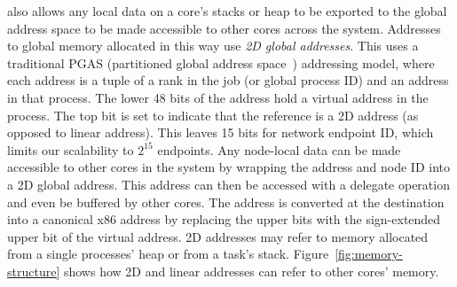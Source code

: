 \Grappa also allows any local data on a core's stacks or heap to be exported
to the global address space to be made accessible to other cores across the
system. Addresses to global memory allocated in this way use \emph{2D global
addresses}. This uses a traditional PGAS (partitioned global address
space~\cite{upc:2005}) addressing model, where each address is a tuple of a
rank in the job (or global process ID) and an address in that process. The
lower 48 bits of the address hold a virtual address in the process. The top
bit is set to indicate that the reference is a 2D address (as opposed to
linear address). This leaves 15 bits for network endpoint ID, which limits our
scalability to $2^{15}$ endpoints. Any node-local data can be made accessible
to other cores in the system by wrapping the address and node ID into a 2D
global address. This address can then be accessed with a delegate operation
and even be buffered by other cores. The address is converted at the destination
into a canonical x86 address by replacing the upper bits with the
sign-extended upper bit of the virtual address. 2D addresses may refer to
memory allocated from a single processes' heap or from a task's stack.
Figure~\ref{fig:memory-structure} shows how 2D and linear addresses can refer
to other cores' memory.


